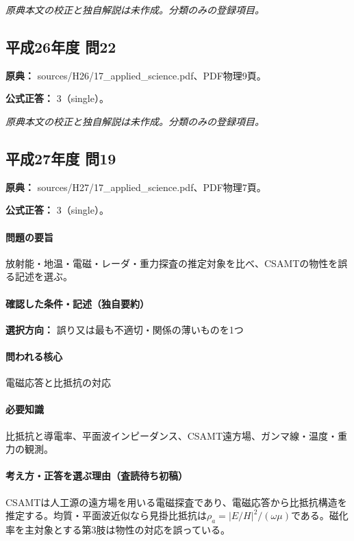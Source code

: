\par\textit{原典本文の校正と独自解説は未作成。分類のみの登録項目。}

\subsection{平成26年度 問22}
\label{q:h26-reg-applied-22}

\noindent\textbf{原典：} sources/H26/17\_applied\_science.pdf、PDF物理9頁。

\textbf{公式正答：} 3（single）。

\par\textit{原典本文の校正と独自解説は未作成。分類のみの登録項目。}

\subsection{平成27年度 問19}
\label{q:h27-reg-applied-19}

\noindent\textbf{原典：} sources/H27/17\_applied\_science.pdf、PDF物理7頁。

\textbf{公式正答：} 3（single）。

\paragraph{問題の要旨} 放射能・地温・電磁・レーダ・重力探査の推定対象を比べ、CSAMTの物性を誤る記述を選ぶ。

\paragraph{確認した条件・記述（独自要約）}\mbox{}\par

\noindent\textbf{選択方向：} 誤り又は最も不適切・関係の薄いものを1つ\par

\paragraph{問われる核心} 電磁応答と比抵抗の対応

\paragraph{必要知識} 比抵抗と導電率、平面波インピーダンス、CSAMT遠方場、ガンマ線・温度・重力の観測。

\paragraph{考え方・正答を選ぶ理由（査読待ち初稿）} CSAMTは人工源の遠方場を用いる電磁探査であり、電磁応答から比抵抗構造を推定する。均質・平面波近似なら見掛比抵抗は\(\rho_a=|E/H|^2/(\omega\mu)\)である。磁化率を主対象とする第3肢は物性の対応を誤っている。

